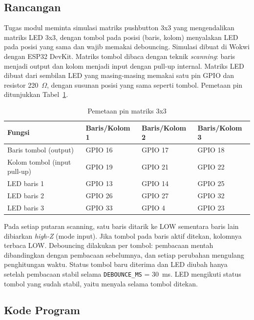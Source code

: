 \subsection{Rancangan}
Tugas modul meminta simulasi matriks pushbutton 3x3 yang mengendalikan matriks LED 3x3, dengan tombol pada posisi (baris, kolom) menyalakan LED pada posisi yang sama dan wajib memakai debouncing. Simulasi dibuat di Wokwi dengan ESP32 DevKit. Matriks tombol dibaca dengan teknik \emph{scanning}: baris menjadi output dan kolom menjadi input dengan pull-up internal. Matriks LED dibuat dari sembilan LED yang masing-masing memakai satu pin GPIO dan resistor 220~$\Omega$, dengan susunan posisi yang sama seperti tombol. Pemetaan pin ditunjukkan Tabel~\ref{tab:pinmatrix}.
\begin{table}[H]
	\centering
	\caption{Pemetaan pin matriks 3x3}
	\label{tab:pinmatrix}
	\begin{tabular}{|l|l|l|l|}
		\hline
		\textbf{Fungsi} & \textbf{Baris/Kolom 1} & \textbf{Baris/Kolom 2} & \textbf{Baris/Kolom 3} \\ \hline
		Baris tombol (output) & GPIO 16 & GPIO 17 & GPIO 18 \\ \hline
		Kolom tombol (input pull-up) & GPIO 19 & GPIO 21 & GPIO 22 \\ \hline
		LED baris 1 & GPIO 13 & GPIO 14 & GPIO 25 \\ \hline
		LED baris 2 & GPIO 26 & GPIO 27 & GPIO 32 \\ \hline
		LED baris 3 & GPIO 33 & GPIO 4 & GPIO 23 \\ \hline
	\end{tabular}
\end{table}
Pada setiap putaran scanning, satu baris ditarik ke LOW sementara baris lain dibiarkan \emph{high-Z} (mode input). Jika tombol pada baris aktif ditekan, kolomnya terbaca LOW. Debouncing dilakukan per tombol: pembacaan mentah dibandingkan dengan pembacaan sebelumnya, dan setiap perubahan mengulang penghitungan waktu. Status tombol baru diterima dan LED diubah hanya setelah pembacaan stabil selama \texttt{DEBOUNCE\_MS} = 30~ms. LED mengikuti status tombol yang sudah stabil, yaitu menyala selama tombol ditekan.

\subsection{Kode Program}



